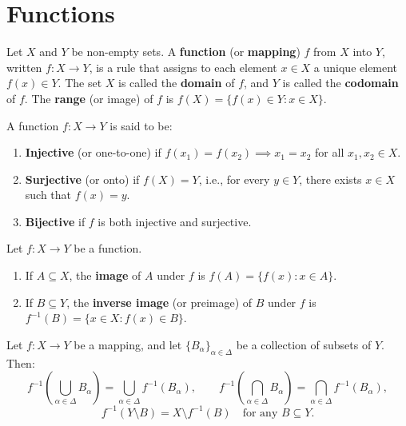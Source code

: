 \section{Functions}
\label{sec:functions}

\begin{definition}[Function]
Let $X$ and $Y$ be non-empty sets. A \textbf{function} (or \textbf{mapping}) $f$ from $X$ into $Y$, written $f: X \to Y$, is a rule that assigns to each element $x \in X$ a unique element $f(x) \in Y$. The set $X$ is called the \textbf{domain} of $f$, and $Y$ is called the \textbf{codomain} of $f$. The \textbf{range} (or image) of $f$ is $f(X) = \{f(x) \in Y : x \in X\}$.
\end{definition}

\begin{definition}
A function $f: X \to Y$ is said to be:
\begin{enumerate}[label=\rm{(\roman*)}]
    \item \textbf{Injective} (or one-to-one) if $f(x_1) = f(x_2) \implies x_1 = x_2$ for all $x_1, x_2 \in X$.
    \item \textbf{Surjective} (or onto) if $f(X) = Y$, i.e., for every $y \in Y$, there exists $x \in X$ such that $f(x) = y$.
    \item \textbf{Bijective} if $f$ is both injective and surjective.
\end{enumerate}
\end{definition}

\begin{definition}
Let $f: X \to Y$ be a function.
\begin{enumerate}[label=\rm{(\roman*)}]
    \item If $A \subseteq X$, the \textbf{image} of $A$ under $f$ is $f(A) = \{f(x) : x \in A\}$.
    \item If $B \subseteq Y$, the \textbf{inverse image} (or preimage) of $B$ under $f$ is $f^{-1}(B) = \{x \in X : f(x) \in B\}$.
\end{enumerate}
\end{definition}

\begin{theorem}
Let $f: X \to Y$ be a mapping, and let $\{B_\alpha\}_{\alpha \in \Delta}$ be a collection of subsets of $Y$. Then:
\[
f^{-1}\left( \bigcup_{\alpha \in \Delta} B_\alpha \right) = \bigcup_{\alpha \in \Delta} f^{-1}(B_\alpha), \qquad
f^{-1}\left( \bigcap_{\alpha \in \Delta} B_\alpha \right) = \bigcap_{\alpha \in \Delta} f^{-1}(B_\alpha),
\]
\[
f^{-1}(Y \setminus B) = X \setminus f^{-1}(B) \quad \text{for any } B \subseteq Y.
\]
\end{theorem}

